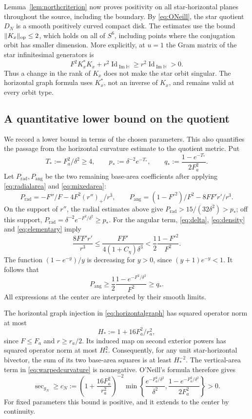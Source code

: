 \documentclass[12pt]{amsart}
\numberwithin{equation}{section}
\theoremstyle{remark}
\newcommand{\Hh}{\mathbb H}
\newcommand{\Id}{\operatorname{Id}}
\newcommand{\Ksec}{\operatorname{sec}}
\begin{document}
Lemma~\ref{lem:northcriterion} now proves positivity on all
star-horizontal planes throughout the source, including the
boundary. By \eqref{eq:ONeill}, the star quotient \(D_N\) is a
smooth positively curved compact disk. The estimates use the bound
\(\|K_x\|_{\rm op}\le2\), which holds on all of \(S^6\), including
points where the conjugation orbit has smaller dimension. More explicitly, at \(u=1\) the Gram matrix of the star
infinitesimal generators is
\[
 F^2K_x^*K_x+r^2\Id_{\operatorname{Im}\Hh}
 \ge r^2\Id_{\operatorname{Im}\Hh}>0.
\]
Thus a change in the rank of \(K_x\) does not make the star orbit
singular. The horizontal graph formula uses \(K_x^*\), not an
inverse of \(K_x\), and remains valid at every orbit type.

\subsection{A quantitative lower bound on the quotient}
We record a lower bound in terms of the chosen parameters. This also
quantifies the passage from the horizontal curvature estimate to the
quotient metric. Put
\[
 T_*:=F_a^2/\delta^2\ge4,\qquad
 p_*:=\delta^{-2}e^{-T_*},\qquad
 q_*:=\frac{1-e^{-T_*}}{2F_a^2}.
\]
Let \(P_{\mathrm{rad}},P_{\mathrm{ang}}\) be the two remaining
base-area coefficients after applying \eqref{eq:radialarea} and
\eqref{eq:mixedarea}:
\[
 P_{\mathrm{rad}}=-F''/F-4F^2(r'')_+/r^3,
 \qquad P_{\mathrm{ang}}=(1-F'^2)/F^2-8FF'r'/r^3.
\]
On the support of \(r''\), the radial estimates above give
\(P_{\mathrm{rad}}>15/(32\delta^2)>p_*\); off this support,
\(P_{\mathrm{rad}}=\delta^{-2}e^{-F^2/\delta^2}\ge p_*\).
For the angular term, \eqref{eq:delta}, \eqref{eq:density} and
\eqref{eq:elementary} imply
\[
 \frac{8FF'r'}{r^3}
 \le\frac{FF'}{4(1+C_\eta)\delta^3}
 <\frac12\frac{1-F'^2}{F^2}.
\]
The function \((1-e^{-y})/y\) is decreasing for \(y>0\), since
\((y+1)e^{-y}<1\). It follows that
\[
 P_{\mathrm{ang}}\ge\frac12\frac{1-e^{-F^2/\delta^2}}{F^2}\ge q_*.
\]
All expressions at the center are interpreted by their smooth limits.

The horizontal graph injection in \eqref{eq:horizontalgraph} has
squared operator norm at most
\[
 H_*:=1+16F_a^2/r_a^2,
\]
since \(F\le F_a\) and \(r\ge r_a/2\). Its induced map on second
exterior powers has squared operator norm at most \(H_*^2\).
Consequently, for any unit star-horizontal bivector, the sum of its
two base-area squares is at least \(H_*^{-2}\). The vertical-area term in \eqref{eq:warpedcurvature} is nonnegative.
O'Neill's formula therefore gives
\begin{equation}\label{eq:northlowerbound}
 \Ksec_{g_N}\ge c_N:=
 \left(1+\frac{16F_a^2}{r_a^2}\right)^{-2}
 \min\left\{\frac{e^{-F_a^2/\delta^2}}{\delta^2},
       \frac{1-e^{-F_a^2/\delta^2}}{2F_a^2}\right\}>0.
\end{equation}
For fixed parameters this bound is positive, and it extends to the
center by continuity.
\end{document}
